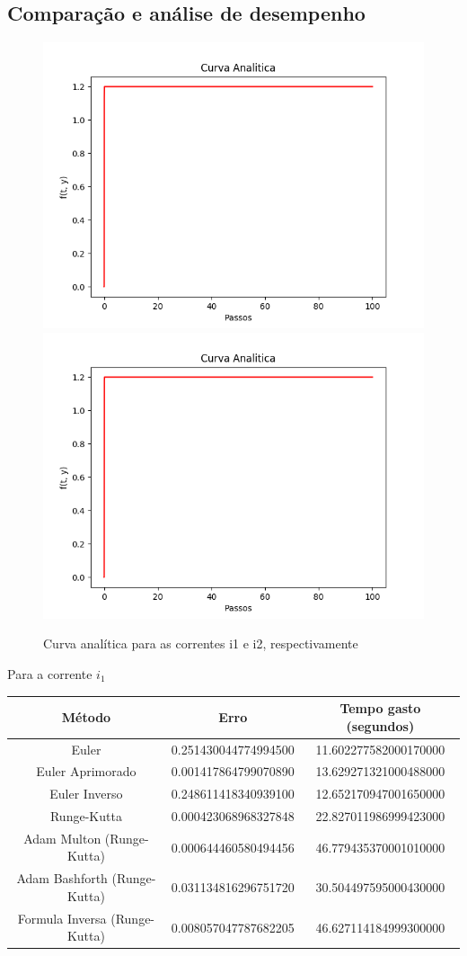 \documentclass[12pt]{article}%
\begin{document}
    \subsection{Comparação e análise de desempenho}
    
    \begin{figure}[H]
        \begin{center}
            \includegraphics[width=.4\textwidth]{problemas/metodos_q2/p2_i1_analitica.png}
            \includegraphics[width=.4\textwidth]{problemas/metodos_q2/p2_i2_analitica.png}
        \end{center}
        \caption{Curva analítica para as correntes i1 e i2, respectivamente}
    \end{figure}
    
    Para a corrente \(i_{1}\)
    \begin{center}
    \begin{tabular}{ |c| |c| |c| }
    \hline
    \textbf{Método}               & \textbf{Erro}        & \textbf{Tempo gasto (segundos)} \\ \hline
    Euler                         & 0.251430044774994500 & 11.602277582000170000           \\ \hline
    Euler Aprimorado              & 0.001417864799070890 & 13.629271321000488000           \\ \hline
    Euler Inverso                 & 0.248611418340939100 & 12.652170947001650000           \\ \hline
    Runge-Kutta                   & 0.000423068968327848 & 22.827011986999423000           \\ \hline
    Adam Multon     (Runge-Kutta) & 0.000644460580494456 & 46.779435370001010000           \\ \hline
    Adam Bashforth (Runge-Kutta)  & 0.031134816296751720 & 30.504497595000430000           \\ \hline
    Formula Inversa (Runge-Kutta) & 0.008057047787682205 & 46.627114184999300000           \\ \hline 
    \end{tabular}
    \end{center}
    
\end{document}
